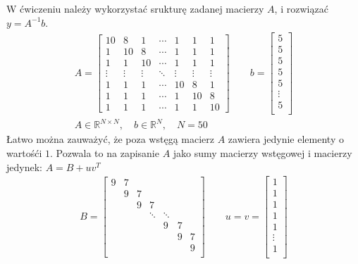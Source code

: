 \documentclass[11pt]{extarticle}
\begin{document}
	\subsection{}
	W ćwiczeniu należy wykorzystać srukturę zadanej macierzy \(A\), i rozwiązać \(y = A^{-1}b\).
	\begin{align}
		A = \begin{bmatrix}
			10		& 8		& 1		& \dotsm	& 1		& 1		& 1 	\\
			1		& 10	& 8		& \dotsm	& 1		& 1		& 1 	\\
			1		& 1		& 10	& \dotsm	& 1		& 1		& 1 	\\
			\vdots	&\vdots	&\vdots	& \ddots	&\vdots	&\vdots	&\vdots	\\
			1		& 1		& 1		& \dotsm	& 10	& 8		& 1 	\\
			1		& 1		& 1		& \dotsm	& 1		& 10	& 8 	\\
			1		& 1		& 1		& \dotsm	& 1		& 1		& 10
		\end{bmatrix} \qquad
		b = \begin{bmatrix}
			5 \\
			5 \\
			5 \\
			5 \\
			5 \\
			\vdots \\
			5 \\
		\end{bmatrix} \\[12pt]
		A \in \mathbb{R}^{N \times N}, \quad
		b \in \mathbb{R}^{N}, \quad
		N = 50
	\end{align}
	Łatwo można zauważyć, że poza wstęgą macierz \(A\) zawiera jedynie elementy o wartośći \(1\).
	Pozwala to na zapisanie \(A\) jako sumy macierzy wstęgowej i macierzy jedynek: \(A = B + uv^T\)
	\begin{align}
		B = \begin{bmatrix}
					9		& 7	\\
			& 		9		& 7 \\
			&& 		9		& 7 \\
			&&&		\ddots	& \ddots \\
			&&&&	9		& 7 \\
			&&&&&	9		& 7 \\
			&&&&&&	9 \\
		\end{bmatrix} \qquad
		u = v = \begin{bmatrix}
			1 \\
			1 \\
			1 \\
			1 \\
			1 \\
			\vdots \\
			1 \\
		\end{bmatrix}
	\end{align}
\end{document}
